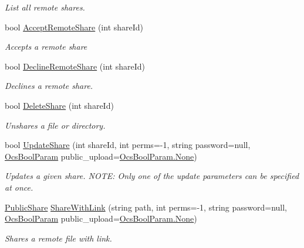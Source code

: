 \begin{DoxyCompactItemize}
\begin{DoxyCompactList}\small\item\em List all remote shares. \end{DoxyCompactList}\item 
bool \hyperlink{classowncloudsharp_1_1_client_ace55eb0544bda9803e493dd80af14970}{Accept\+Remote\+Share} (int share\+Id)
\begin{DoxyCompactList}\small\item\em Accepts a remote share \end{DoxyCompactList}\item 
bool \hyperlink{classowncloudsharp_1_1_client_a8936411abf14870d211e4a62be3d7840}{Decline\+Remote\+Share} (int share\+Id)
\begin{DoxyCompactList}\small\item\em Declines a remote share. \end{DoxyCompactList}\item 
bool \hyperlink{classowncloudsharp_1_1_client_a7499d8f0c4fae0b22da4a35327547cca}{Delete\+Share} (int share\+Id)
\begin{DoxyCompactList}\small\item\em Unshares a file or directory. \end{DoxyCompactList}\item 
bool \hyperlink{classowncloudsharp_1_1_client_a096e6b5540091d8b3f296d899f4807dd}{Update\+Share} (int share\+Id, int perms=-\/1, string password=null, \hyperlink{namespaceowncloudsharp_a7d494b18f174086318df1bdf916068b5}{Ocs\+Bool\+Param} public\+\_\+upload=\hyperlink{namespaceowncloudsharp_a86ba7b86b85c7f5be2304a1ef7ae3157a6adf97f83acf6453d4a6a4b1070f3754}{Ocs\+Bool\+Param.\+None})
\begin{DoxyCompactList}\small\item\em Updates a given share. N\+O\+TE\+: Only one of the update parameters can be specified at once. \end{DoxyCompactList}\item 
\hyperlink{classowncloudsharp_1_1_types_1_1_public_share}{Public\+Share} \hyperlink{classowncloudsharp_1_1_client_ac44012d849ddbbbdab86509344d6504d}{Share\+With\+Link} (string path, int perms=-\/1, string password=null, \hyperlink{namespaceowncloudsharp_a7d494b18f174086318df1bdf916068b5}{Ocs\+Bool\+Param} public\+\_\+upload=\hyperlink{namespaceowncloudsharp_a86ba7b86b85c7f5be2304a1ef7ae3157a6adf97f83acf6453d4a6a4b1070f3754}{Ocs\+Bool\+Param.\+None})
\begin{DoxyCompactList}\small\item\em Shares a remote file with link. \end{DoxyCompactList}\item 

\end{DoxyCompactItemize}
